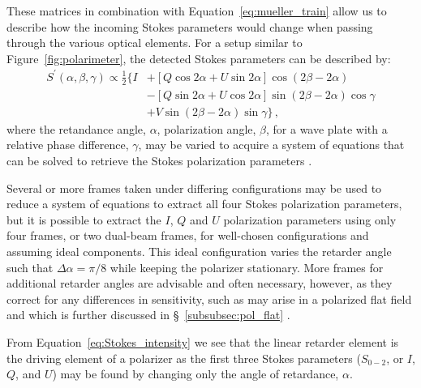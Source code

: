 These matrices in combination with Equation~\ref{eq:mueller_train} allow us to describe how the incoming Stokes parameters would change when passing through the various optical elements. For a setup similar to Figure~\ref{fig:polarimeter}, the detected Stokes parameters can be described by:
\begin{equation}
    \begin{split}
        S^{\prime}(\alpha, \beta, \gamma) \propto \frac{1}{2} \{ I & + [Q \cos2\alpha + U \sin2\alpha] \cos(2\beta - 2\alpha) \\
        & - [Q \sin2\alpha + U \cos2\alpha] \sin(2\beta - 2\alpha) \cos\gamma \label{eq:Stokes_intensity} \\
        & + V \sin(2\beta - 2\alpha)\sin\gamma \}\,,
    \end{split}
\end{equation}
where the retandance angle, $\alpha$, polarization angle, $\beta$, for a wave plate with a relative phase difference, $\gamma$, may be varied to acquire a system of equations that can be solved to retrieve the Stokes polarization parameters \citep{waveplate_in_specpol}.

Several or more frames taken under differing configurations may be used to reduce a system of equations to extract all four Stokes polarization parameters, but it is possible to extract the $I$, $Q$ and $U$ polarization parameters using only four frames, or two dual-beam frames, for well-chosen configurations and assuming ideal components. This ideal configuration varies the retarder angle such that $\Delta\alpha = \pi / 8$ while keeping the polarizer stationary. More frames for additional retarder angles are advisable and often necessary, however, as they correct for any differences in sensitivity, such as may arise in a polarized flat field and which is further discussed in \S~\ref{subsubsec:pol_flat} \citep{polarimetry_error}.

From Equation~\ref{eq:Stokes_intensity} we see that the linear retarder element is the driving element of a polarizer as the first three Stokes parameters ($S_{0-2}$, or $I$, $Q$, and $U$) may be found by changing only the angle of retardance, $\alpha$.

